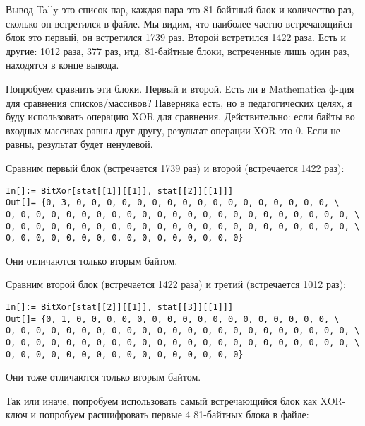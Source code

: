 Вывод Tally это список пар, каждая пара это 81-байтный блок и количество раз, сколько он встретился в файле.
Мы видим, что наиболее частно встречающийся блок это первый, он встретился 1739 раз.
Второй встретился 1422 раза. Есть и другие: 1012 раза, 377 раз, итд.
81-байтные блоки, встреченные лишь один раз, находятся в конце вывода.

Попробуем сравнить эти блоки. Первый и второй.
Есть ли в Mathematica ф-ция для сравнения списков/массивов?
Наверняка есть, но в педагогических целях, я буду использовать операцию XOR для сравнения.
Действительно: если байты во входных массивах равны друг другу, результат операции XOR это 0.
Если не равны, результат будет ненулевой.

Сравним первый блок (встречается 1739 раз) и второй (встречается 1422 раз):

\begin{lstlisting}[style=custommath]
In[]:= BitXor[stat[[1]][[1]], stat[[2]][[1]]]
Out[]= {0, 3, 0, 0, 0, 0, 0, 0, 0, 0, 0, 0, 0, 0, 0, 0, 0, 0, 0, \
0, 0, 0, 0, 0, 0, 0, 0, 0, 0, 0, 0, 0, 0, 0, 0, 0, 0, 0, 0, 0, 0, 0, \
0, 0, 0, 0, 0, 0, 0, 0, 0, 0, 0, 0, 0, 0, 0, 0, 0, 0, 0, 0, 0, 0, 0, \
0, 0, 0, 0, 0, 0, 0, 0, 0, 0, 0, 0, 0, 0, 0, 0}
\end{lstlisting}

Они отличаются только вторым байтом.

Сравним второй блок (встречается 1422 раза) и третий (встречается 1012 раз):

\begin{lstlisting}[style=custommath]
In[]:= BitXor[stat[[2]][[1]], stat[[3]][[1]]]
Out[]= {0, 1, 0, 0, 0, 0, 0, 0, 0, 0, 0, 0, 0, 0, 0, 0, 0, 0, 0, \
0, 0, 0, 0, 0, 0, 0, 0, 0, 0, 0, 0, 0, 0, 0, 0, 0, 0, 0, 0, 0, 0, 0, \
0, 0, 0, 0, 0, 0, 0, 0, 0, 0, 0, 0, 0, 0, 0, 0, 0, 0, 0, 0, 0, 0, 0, \
0, 0, 0, 0, 0, 0, 0, 0, 0, 0, 0, 0, 0, 0, 0, 0}
\end{lstlisting}

Они тоже отличаются только вторым байтом.

Так или иначе, попробуем использовать самый встречающийся блок как XOR-ключ и попробуем расшифровать первые 4 81-байтных
блока в файле:

